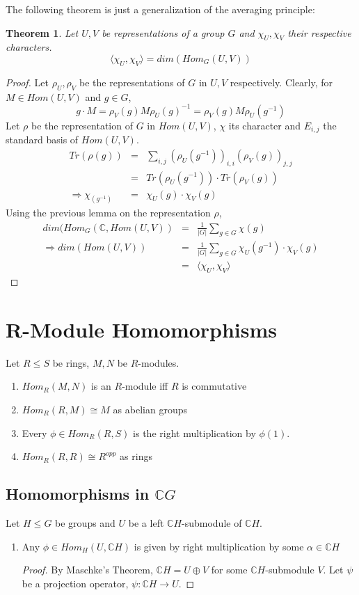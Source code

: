 \documentclass{sig-alternate}
\newtheorem{theorem}{Theorem}[section]
\begin{document}
\noindent The following theorem is just a generalization of the averaging principle:
\begin{theorem}
Let $U,V$ be representations of a group $G$ and $\chi_U, \chi_V$ their respective characters.
\[ \langle\chi_U, \chi_V\rangle = dim(Hom_G(U,V)) \]
\end{theorem}
\begin{proof}
Let $\rho_U, \rho_V$ be the representations of $G$ in $U,V$ respectively.
Clearly, for $M\in Hom(U,V)$ and $g\in G$,
\[ g\cdot M = \rho_V(g)M\rho_U(g)^{-1} =  \rho_V(g)M\rho_U(g^{-1}) \]
Let $\rho$ be the representation of $G$ in $Hom(U,V)$, $\chi$ its character and $E_{i,j}$ the standard basis of $Hom(U,V)$.
\begin{eqnarray*}
Tr(\rho(g)) & = & \sum_{i,j}(\rho_U(g^{-1}))_{i,i}(\rho_V(g))_{j,j} \\
& = & Tr(\rho_U(g^{-1}))\cdot Tr(\rho_V(g)) \\
\Rightarrow \chi_(g^{-1}) & = & \chi_U(g)\cdot \chi_V(g)
\end{eqnarray*}
Using the previous lemma on the representation $\rho$,
\begin{eqnarray*}
dim(Hom_G(\mathbb{C}, Hom(U,V)) & = & \frac{1}{|G|}\sum_{g\in G}\chi(g) \\
\Rightarrow dim(Hom(U,V)) & = & \frac{1}{|G|}\sum_{g\in G}\chi_U(g^{-1})\cdot \chi_V(g) \\
& = & \langle\chi_U, \chi_V\rangle
\end{eqnarray*}
\end{proof}

\section{R-Module Homomorphisms}
Let $R \leq S$ be rings, $M,N$ be $R$-modules.
\begin{enumerate}
\item $Hom_R(M,N)$ is an $R$-module iff $R$ is commutative
\item $Hom_R(R, M) \cong M$ as abelian groups
\item Every $\phi \in Hom_R(R, S)$ is the right multiplication by $\phi(1)$.
\item $Hom_R(R,R) \cong R^{opp}$ as rings
\end{enumerate}

\subsection{Homomorphisms in $\mathbb{C}G$}
Let $H \leq G$ be groups and $U$ be a left $\mathbb{C}H$-submodule of $\mathbb{C}H$.
\begin{enumerate}
\item Any $\phi \in Hom_H(U, \mathbb{C}H)$ is given by right multiplication by  some $\alpha \in \mathbb{C}H$
\begin{proof}
By Maschke's Theorem, $\mathbb{C}H = U \oplus  V$ for some $\mathbb{C}H$-submodule $V$. Let $\psi$ be a projection operator, $\psi:\mathbb{C}H \rightarrow U$. 
\end{proof}

\end{enumerate}
\end{document}
